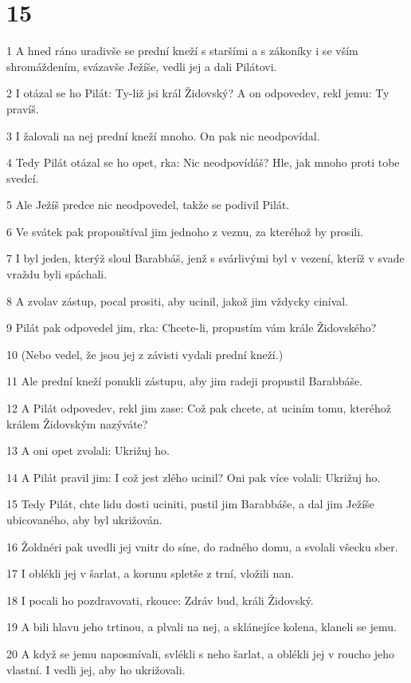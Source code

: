 \chapter{15}

\par 1 A hned ráno uradivše se prední kneží s staršími a s zákoníky i se vším shromáždením, svázavše Ježíše, vedli jej a dali Pilátovi.
\par 2 I otázal se ho Pilát: Ty-liž jsi král Židovský? A on odpovedev, rekl jemu: Ty pravíš.
\par 3 I žalovali na nej prední kneží mnoho. On pak nic neodpovídal.
\par 4 Tedy Pilát otázal se ho opet, rka: Nic neodpovídáš? Hle, jak mnoho proti tobe svedcí.
\par 5 Ale Ježíš predce nic neodpovedel, takže se podivil Pilát.
\par 6 Ve svátek pak propouštíval jim jednoho z veznu, za kteréhož by prosili.
\par 7 I byl jeden, kterýž sloul Barabbáš, jenž s svárlivými byl v vezení, kteríž v svade vraždu byli spáchali.
\par 8 A zvolav zástup, pocal prositi, aby ucinil, jakož jim vždycky ciníval.
\par 9 Pilát pak odpovedel jim, rka: Chcete-li, propustím vám krále Židovského?
\par 10 (Nebo vedel, že jsou jej z závisti vydali prední kneží.)
\par 11 Ale prední kneží ponukli zástupu, aby jim radeji propustil Barabbáše.
\par 12 A Pilát odpovedev, rekl jim zase: Což pak chcete, at uciním tomu, kteréhož králem Židovským nazýváte?
\par 13 A oni opet zvolali: Ukrižuj ho.
\par 14 A Pilát pravil jim: I což jest zlého ucinil? Oni pak více volali: Ukrižuj ho.
\par 15 Tedy Pilát, chte lidu dosti uciniti, pustil jim Barabbáše, a dal jim Ježíše ubicovaného, aby byl ukrižován.
\par 16 Žoldnéri pak uvedli jej vnitr do síne, do radného domu, a svolali všecku sber.
\par 17 I oblékli jej v šarlat, a korunu spletše z trní, vložili nan.
\par 18 I pocali ho pozdravovati, rkouce: Zdráv bud, králi Židovský.
\par 19 A bili hlavu jeho trtinou, a plvali na nej, a sklánejíce kolena, klaneli se jemu.
\par 20 A když se jemu naposmívali, svlékli s neho šarlat, a oblékli jej v roucho jeho vlastní. I vedli jej, aby ho ukrižovali.
